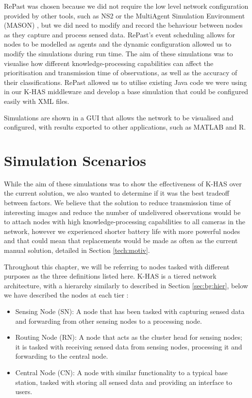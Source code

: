 RePast was chosen because we did not require the low level network configuration provided by other tools, such as NS2 \cite{mccanne1997network} or the MultiAgent Simulation Environment (MASON) \cite{mason}, but we did need to modify and record the behaviour between nodes as they capture and process sensed data. RePast's event scheduling allows for nodes to be modelled as agents and the dynamic configuration allowed us to modify the simulations during run time. The aim of these simulations was to visualise how different knowledge-processing capabilities can affect the prioritisation and transmission time of observations, as well as the accuracy of their classifications. RePast allowed us to utilise existing Java code we were using in our K-HAS middleware and develop a base simulation that could be configured easily with XML files.

Simulations are shown in a GUI that allows the network to be visualised and configured, with results exported to other applications, such as MATLAB and R.

\section{Simulation Scenarios}\label{sim:scen}
While the aim of these simulations was to show the effectiveness of K-HAS over the current solution, we also wanted to determine if it was the best tradeoff between factors. We believe that the solution to reduce transmission time of interesting images and reduce the number of undelivered observations would be to attach nodes with high knowledge-processing capabilities to all cameras in the network, however we experienced shorter battery life with more powerful nodes and that could mean that replacements would be made as often as the current manual solution, detailed in Section \ref{tech:motiv}.

Throughout this chapter, we will be referring to nodes tasked with different purposes as the three definitions listed here. K-HAS is a tiered network architecture, with a hierarchy similarly to described in Section \ref{sec:bg:hier}, below we have described the nodes at each tier :
	\begin{itemize}
		\item Sensing Node (SN): A node that has been tasked with capturing sensed data and forwarding from other sensing nodes to a processing node.
		\item Routing Node (RN): A node that acts as the cluster head for sensing nodes; it is tasked with receiving sensed data from sensing nodes, processing it and forwarding to the central node.
		\item Central Node (CN): A node with similar functionality to a typical base station, tasked with storing all sensed data and providing an interface to users.
	\end{itemize}

